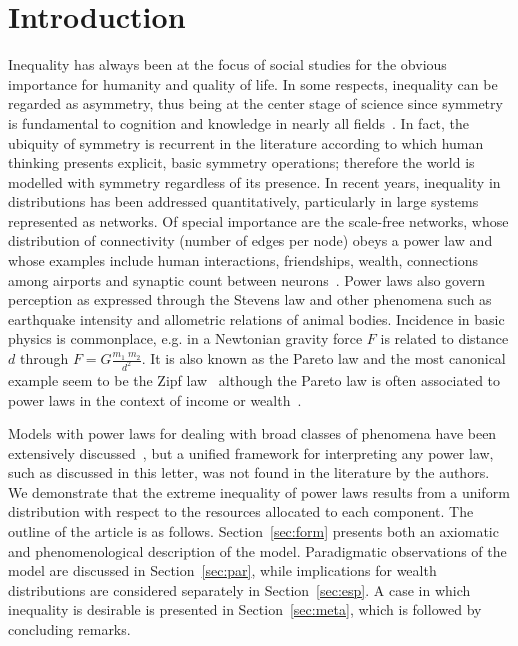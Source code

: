 \documentclass[a4paper, 11pt]{article} %
\begin{document}
\section{Introduction}
Inequality has always been at the focus of social studies for the obvious importance for humanity and quality of life.
In some respects, inequality can be regarded as asymmetry, thus being at the center stage of science since symmetry is fundamental to cognition and knowledge in nearly all fields~\cite{deleuze,part}.
In fact, the ubiquity of symmetry is recurrent in the literature according to which human thinking presents explicit, basic symmetry operations; therefore the world is modelled with symmetry regardless of its presence.
In recent years, inequality in distributions has been addressed quantitatively, particularly in large systems represented as networks.
Of special importance are the scale-free networks, whose distribution of connectivity (number of edges per node) obeys a power law
and whose
examples include human interactions, friendships, wealth, 
connections among airports and synaptic count between neurons~\cite{newman}.
Power laws also govern perception as expressed through the Stevens law
and other phenomena such as
earthquake intensity and allometric relations of animal bodies.
Incidence in basic physics is commonplace, e.g. in a Newtonian gravity force $F$ is related to distance $d$ through
$F=G\frac{m_1\;m_2}{d^2}$.
It is also known as the Pareto law and the most canonical example seem to be the Zipf law~\cite{newmanpower}
although the Pareto law is often associated to power laws in the context of income or wealth~\cite{lada,economics}.

Models with power laws for dealing with broad classes of phenomena have been extensively discussed~\cite{part,pbook},
but a unified framework for interpreting any power law, such as discussed in this letter, was not found in the literature by the authors.
We demonstrate that the extreme inequality of power laws results from a uniform distribution with respect to the resources allocated to each component.
The outline of the article is as follows.
Section~\ref{sec:form} presents both an axiomatic and phenomenological description of the model.
Paradigmatic observations of the model are discussed in Section~\ref{sec:par},
while implications for wealth distributions are considered separately in Section~\ref{sec:esp}.
A case in which inequality is desirable is presented in Section~\ref{sec:meta}, which is followed by concluding remarks.
\end{document}
